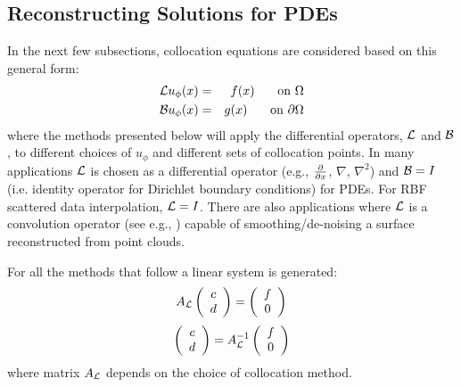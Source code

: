 \documentclass[11pt]{report}
\begin{document}
{\subsection{Reconstructing Solutions for PDEs}
In the next few subsections, collocation equations are considered based on this general form: 
\begin{eqnarray*}
\mathcal{L}u_\phi(x) &=& f(x) \hskip1.5em \textrm{ on } \Omega \label{eqn:colloc_interior}\\ 
\mathcal{B}u_\phi(x) &=& g(x) \hskip1.5em \textrm{ on } \partial \Omega  \label{eqn:colloc_boundary} 
\end{eqnarray*}
where the methods presented below will apply the differential operators, $\mathcal{L}$ and $\mathcal{B}$, to different choices of $u_\phi$ and different sets of collocation points. In many applications $\mathcal{L}$ is chosen as a differential operator (e.g., $\frac{\partial }{\partial x}$, $\nabla$, $\nabla^2$) and $\mathcal{B}= I$ (i.e. identity operator for Dirichlet boundary conditions) for PDEs. For RBF scattered data interpolation, $\mathcal{L} = I$. There are also  applications where $\mathcal{L}$ is a convolution operator (see e.g., \cite{Carr2001, Carr2003}) capable of smoothing/de-noising a surface reconstructed from point clouds. 

For all the methods that follow a linear system is generated: 
$$
A_{\mathcal{L}}  \left( \begin{array}{cc}  c \\ d  \end{array} \right)  =  \left( \begin{array}{cc}  f \\ 0  \end{array} \right) 
$$
\begin{equation}
  \left( \begin{array}{cc}  c \\ d  \end{array} \right) = A^{-1}_{\mathcal{L}}  \left( \begin{array}{cc}  f \\ 0  \end{array} \right) \nonumber
 \end{equation}
 where matrix $A_{\mathcal{L}}$ depends on the choice of collocation method. 

}
\end{document}
